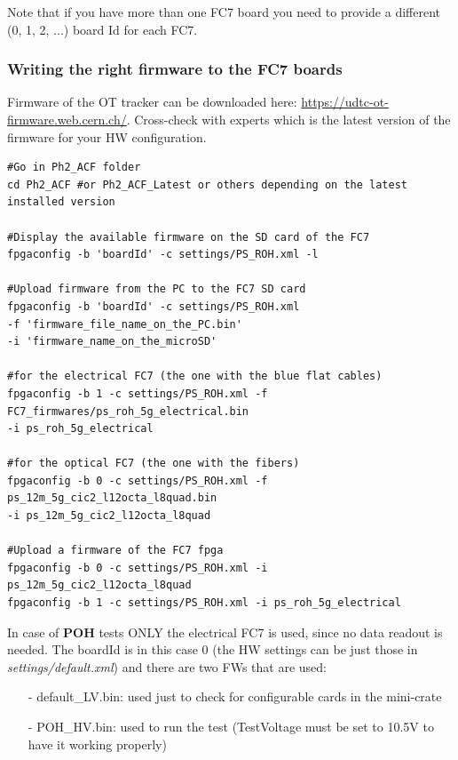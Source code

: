 \documentclass[10pt,a4paper]{article}
\begin{document}
Note that if you have more than one FC7 board you need to provide a different (0, 1, 2, ...) board Id for each FC7.

\subsubsection{Writing the right firmware to the FC7 boards}
Firmware of the OT tracker can be downloaded here: \url{https://udtc-ot-firmware.web.cern.ch/}.
Cross-check with experts which is the latest version of the firmware for your HW configuration.

\begin{framed}
\begin{verbatim}
#Go in Ph2_ACF folder
cd Ph2_ACF #or Ph2_ACF_Latest or others depending on the latest installed version

#Display the available firmware on the SD card of the FC7
fpgaconfig -b 'boardId' -c settings/PS_ROH.xml -l

#Upload firmware from the PC to the FC7 SD card
fpgaconfig -b 'boardId' -c settings/PS_ROH.xml 
-f 'firmware_file_name_on_the_PC.bin' 
-i 'firmware_name_on_the_microSD'

#for the electrical FC7 (the one with the blue flat cables)
fpgaconfig -b 1 -c settings/PS_ROH.xml -f FC7_firmwares/ps_roh_5g_electrical.bin 
-i ps_roh_5g_electrical

#for the optical FC7 (the one with the fibers)
fpgaconfig -b 0 -c settings/PS_ROH.xml -f ps_12m_5g_cic2_l12octa_l8quad.bin 
-i ps_12m_5g_cic2_l12octa_l8quad

#Upload a firmware of the FC7 fpga
fpgaconfig -b 0 -c settings/PS_ROH.xml -i  ps_12m_5g_cic2_l12octa_l8quad
fpgaconfig -b 1 -c settings/PS_ROH.xml -i ps_roh_5g_electrical
\end{verbatim}
\end{framed}

In case of {\bf POH} tests ONLY the electrical FC7 is used, since no data readout is needed. The boardId is in this case 0 (the HW settings can be just those in {\it settings/default.xml}) and there are two FWs that are used:
\begin{itemize}
\item[-] default\_LV.bin: used just to check for configurable cards in the mini-crate
\item[-] POH\_HV.bin: used to run the test (TestVoltage must be set to 10.5V to have it working properly)
\end{itemize}
 
\end{document}
